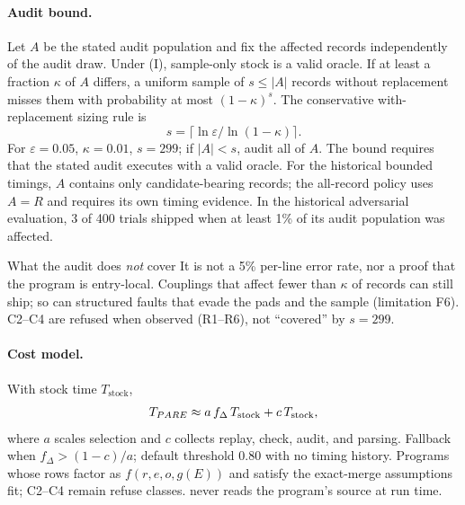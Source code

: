 \paragraph{Audit bound.}
Let $A$ be the stated audit population and fix the affected records
independently of the audit draw. Under (I), sample-only stock is a valid
oracle. If at least a fraction $\kappa$ of $A$ differs, a uniform sample
of $s\le |A|$ records without replacement misses them with probability
at most $(1-\kappa)^s$. The conservative with-replacement sizing rule is
\begin{equation}
s=\bigl\lceil\ln\varepsilon/\ln(1-\kappa)\bigr\rceil.
\label{eq:audit-s}
\end{equation}
For $\varepsilon=0.05$, $\kappa=0.01$, $s=299$; if $|A|<s$, audit all of $A$.
The bound requires that the stated audit executes with a valid oracle.
For the historical bounded timings, $A$ contains only candidate-bearing
records; the all-record policy uses $A=R$ and requires its own timing evidence.
In the historical adversarial evaluation, 3 of 400 trials shipped when
at least 1\% of its audit population was affected.
\begin{plainbox}{What the audit does \emph{not} cover}
It is not a 5\% per\nobreakdash-line error rate, nor a proof that the program is entry\nobreakdash-local.
Couplings that affect fewer than $\kappa$ of records can still ship; so can structured faults that evade the pads and the sample (limitation F6).
C2--C4 are refused when observed (R1--R6), not ``covered'' by $s{=}299$.
\end{plainbox}

\paragraph{Cost model.}
With stock time $T_{\mathrm{stock}}$,
\begin{equation}
T_{PARE}\approx a\,f_\Delta\,T_{\mathrm{stock}}+c\,T_{\mathrm{stock}},
\label{eq:cost}
\end{equation}
where $a$ scales selection and $c$ collects replay, check, audit, and parsing.
Fallback when $f_\Delta>(1-c)/a$; default threshold $0.80$ with no timing history.
Programs whose rows factor as $f(r,e,o,g(E))$ and satisfy the exact-merge
assumptions fit; C2--C4 remain refuse
classes. \sys never reads the program's source at run time.

